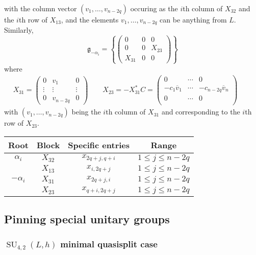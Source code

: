 \documentclass[12pt]{article}
\theoremstyle{definition}
\numberwithin{theorem}{subsection}
\newcommand{\lb}{\left\{}
\newcommand{\rb}{\right\}}
\newcommand{\ov}{\overline}
\newcommand{\frakg}{\mathfrak{g}}
\DeclareMathOperator{\SU}{SU}
\begin{document}
with the column vector $(v_1, \ldots, v_{n-2q})$ occuring as the $i$th column of $X_{32}$ and the $i$th row of $X_{13}$, and the elements $v_1, \ldots, v_{n-2q}$ can be anything from $L$. Similarly,
\[
	\frakg_{-\alpha_i} = \lb
	\begin{pmatrix}
		0 & 0 & 0 \\
		0 & 0 & X_{23} \\
		X_{31} & 0 & 0
	\end{pmatrix}
	\rb
\]
where
\begin{align*}
	X_{31} =
	\begin{pmatrix}
		0 & v_1 & 0 \\
		\vdots & \vdots & \vdots \\
		0 & v_{n-2q} & 0
	\end{pmatrix}
	\qquad
	X_{23} = - X_{31}^* C =
	\begin{pmatrix}
		0 & \cdots & 0 \\
		-  c_1 \ov v_1 & \cdots & -   c_{n-2q} \ov v_n \\
		0 & \cdots & 0 \\
	\end{pmatrix}
	\qquad
\end{align*}
with $(v_1, \ldots, v_{n-2q})$ being the $i$th column of $X_{31}$ and corresponding to the $i$th row of $X_{23}$. 
\begin{center}
	\begin{tabular}{c|c|c|c}
		Root & Block & Specific entries & Range \\
		\hline
		$\alpha_i$ & $X_{32}$ & $x_{2q+j,q+i}$ & $1 \le j \le n-2q$ \\
		& $X_{13}$ & $x_{i, 2q+j}$ & $1 \le j \le n-2q$ \\
		\hline
		$- \alpha_i$ & $X_{31}$ & $x_{2q+j, i}$ & $1 \le j \le n-2q$ \\
		& $X_{23}$ & $x_{q+i, 2q+j}$ & $1 \le j \le n-2q$
	\end{tabular}
\end{center}

\subsection{Pinning special unitary groups}

\subsubsection{$\SU_{4,2}(L,h)$ minimal quasisplit case}
\end{document}
